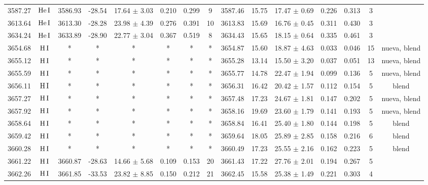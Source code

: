 \documentclass{article}
\begin{document}
\begin{table*}
\begin{adjustbox}{width=\textwidth}
\begin{tabular}{ccccccccccccccc}
3587.27 & $\mbox{He}\thinspace \mbox{I}$ & 3586.93 & -28.54 & 17.64 $\pm$ 3.03 & 0.210 & 0.299 & 9 & 3587.46 & 15.75 & 17.47 $\pm$ 0.69 & 0.226 & 0.313 & 3 &  \\
3613.64 & $\mbox{He}\thinspace \mbox{I}$ & 3613.30 & -28.28 & 23.98 $\pm$ 4.39 & 0.276 & 0.391 & 10 & 3613.83 & 15.69 & 16.76 $\pm$ 0.45 & 0.311 & 0.430 & 3 &  \\
3634.24 & $\mbox{He}\thinspace \mbox{I}$ & 3633.89 & -28.90 & 22.77 $\pm$ 3.04 & 0.367 & 0.519 & 8 & 3634.43 & 15.65 & 18.15 $\pm$ 0.64 & 0.335 & 0.461 & 3 &  \\
3654.68 & $\mbox{H}\thinspace \mbox{I}$ & * & * & * & * & * & * & 3654.87 & 15.60 & 18.87 $\pm$ 4.63 & 0.033 & 0.046 & 15 &  nueva, blend \\
3655.12 & $\mbox{H}\thinspace \mbox{I}$ & * & * & * & * & * & * & 3655.28 & 13.14 & 15.50 $\pm$ 3.20 & 0.037 & 0.051 & 13 &  nueva, blend \\
3655.59 & $\mbox{H}\thinspace \mbox{I}$ & * & * & * & * & * & * & 3655.77 & 14.78 & 22.47 $\pm$ 1.94 & 0.099 & 0.136 & 5 &  nueva, blend \\
3656.11 & $\mbox{H}\thinspace \mbox{I}$ & * & * & * & * & * & * & 3656.31 & 16.42 & 20.42 $\pm$ 1.57 & 0.112 & 0.154 & 5 &  blend \\
3657.27 & $\mbox{H}\thinspace \mbox{I}$ & * & * & * & * & * & * & 3657.48 & 17.23 & 24.67 $\pm$ 1.81 & 0.147 & 0.202 & 5 &  nueva, blend \\
3657.92 & $\mbox{H}\thinspace \mbox{I}$ & * & * & * & * & * & * & 3658.16 & 19.69 & 23.60 $\pm$ 1.79 & 0.141 & 0.193 & 5 &  nueva, blend \\
3658.64 & $\mbox{H}\thinspace \mbox{I}$ & * & * & * & * & * & * & 3658.84 & 16.41 & 25.40 $\pm$ 1.80 & 0.144 & 0.198 & 5 &  blend \\
3659.42 & $\mbox{H}\thinspace \mbox{I}$ & * & * & * & * & * & * & 3659.64 & 18.05 & 25.89 $\pm$ 2.85 & 0.158 & 0.216 & 6 &  blend \\
3660.28 & $\mbox{H}\thinspace \mbox{I}$ & * & * & * & * & * & * & 3660.49 & 17.23 & 25.55 $\pm$ 2.16 & 0.162 & 0.223 & 5 &  blend \\
3661.22 & $\mbox{H}\thinspace \mbox{I}$ & 3660.87 & -28.63 & 14.66 $\pm$ 5.68 & 0.109 & 0.153 & 20 & 3661.43 & 17.22 & 27.76 $\pm$ 2.01 & 0.194 & 0.267 & 5 &  \\
3662.26 & $\mbox{H}\thinspace \mbox{I}$ & 3661.85 & -33.53 & 23.82 $\pm$ 8.85 & 0.150 & 0.212 & 21 & 3662.45 & 15.58 & 25.38 $\pm$ 1.49 & 0.221 & 0.303 & 4 &  \\

\end{tabular}
\end{adjustbox}
\end{table*}
\end{document}
